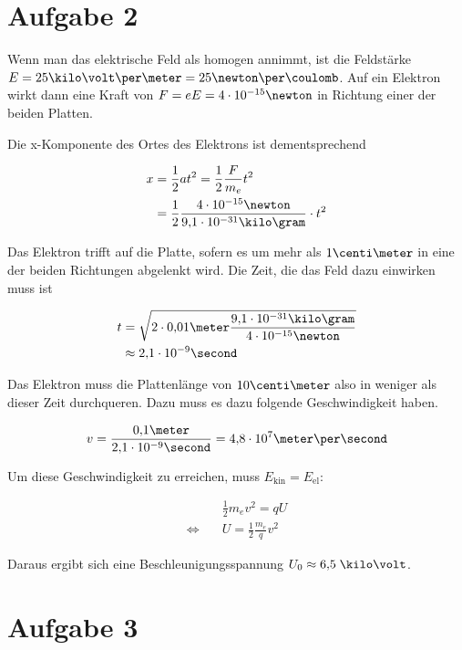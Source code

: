 \documentclass[a4paper,german,12pt,smallheadings]{scrartcl}
\begin{document}
\section*{Aufgabe 2}
Wenn man das elektrische Feld als homogen annimmt, ist die Feldstärke $E = 25
\kilo\volt\per\meter = 25 \newton\per\coulomb$. Auf ein Elektron wirkt dann
eine Kraft von $F = eE = 4 \cdot 10^{-15} \newton$ in Richtung einer der beiden
Platten.

Die x-Komponente des Ortes des Elektrons ist dementsprechend 

\begin{align*}
  x &= \frac{1}{2}at^2 = \frac{1}{2} \frac{F}{m_e} t^2 \\
    &= \frac{1}{2} \frac{4 \cdot 10^{-15} \newton}{9{,}1 \cdot 10^{-31} \kilo\gram} \cdot t^2
\end{align*}

Das Elektron trifft auf die Platte, sofern es um mehr als $1 \centi\meter$ in
eine der beiden Richtungen abgelenkt wird. Die Zeit, die das Feld dazu
einwirken muss ist

\begin{align*}
  t &= \sqrt{2\cdot 0{,}01 \meter \frac{9{,}1 \cdot 10^{-31} \kilo\gram}{4 \cdot 10^{-15} \newton}} \\
    &\approx 2{,}1 \cdot 10^{-9} \second
\end{align*}

Das Elektron muss die Plattenlänge von $10 \centi\meter$ also in weniger als dieser Zeit durchqueren. Dazu muss es dazu folgende Geschwindigkeit haben.

\begin{align*}
  v = \frac{0{,}1 \meter}{2{,}1 \cdot 10^{-9} \second} = 4{,}8 \cdot 10^{7} \meter\per\second
\end{align*}

Um diese Geschwindigkeit zu erreichen, muss $E_{\operatorname{kin}} = E_{\operatorname{el}}$:

\begin{align*}
  &\frac{1}{2} m_e v^2 = qU \\
  \Leftrightarrow \quad & U = \frac{1}{2} \frac{m_e}{q} v^2
\end{align*}

Daraus ergibt sich eine Beschleunigungsspannung $U_0 \approx 6{,}5 \;\kilo\volt$.

\section*{Aufgabe 3}
\end{document}
